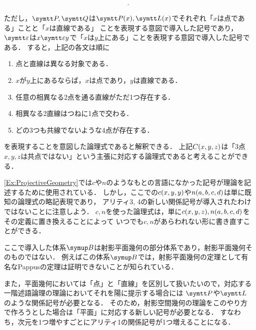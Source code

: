 \begin{Ex}
\begin{enumerate}
\begin{align*}
{			      }.
		      \end{align*}
	\end{enumerate}
	ただし，\(\obj{P}, \obj{Q}\)は\(\apply{\obj{P}}{x}, \apply{\obj{L}}{x}\)でそれぞれ「\(x\)は点である」ことと「\(x\)は直線である」
	ことを表現する意図で導入した記号であり，
	\(\LiesOn\)は\(x \LiesOn y\)で「\(x\)は\(y\)上にある」ことを表現する意図で導入した記号である．
	すると，上記の各文は順に
	\begin{enumerate}
		\item 点と直線は異なる対象である．
		\item \(x\)が\(y\)上にあるならば，\(x\)は点であり，\(y\)は直線である．
		\item 任意の相異なる2点を通る直線がただ1つ存在する．
		\item 相異なる2直線はつねに1点で交わる．
		\item どの3つも共線でないような4点が存在する．
	\end{enumerate}
	を表現することを意図した論理式であると解釈できる．
	上記\(\apply{C}{x, y, z}\)は「3点\(x, y, z\)は共点ではない」という主張に対応する論理式であると考えることができる．
\end{Ex}

\begin{Note}
	\cref{Ex:ProjectiveGeometry}では\(c\)や\(n\)のようなもとの言語になかった記号が理論を記述するために使用されている．
	しかし，ここでの\(\apply{c}{x, y, y}\)や\(\apply{n}{a, b, c, d}\)は単に既知の論理式の略記表現であり，
	アリティ3, 4の新しい関係記号が導入されたわけではないことに注意しよう．
	\(c, n\)を使った論理式は，単に\(\apply{c}{x, y, z}, \apply{n}{a, b, c, d}\)をその定義に置き換えることによって
	いつでも\(c, n\)があらわれない形に書き直すことができる．
\end{Note}

\begin{Note}
	ここで導入した体系\(\ProjectiveGeometryPart\)は射影平面幾何の部分体系であり，射影平面幾何そのものではない．
	例えばこの体系\(\ProjectiveGeometryPart\)では，射影平面幾何の定理として有名なPappusの定理は証明できないことが知られている．

	また，平面幾何においては「点」と「直線」を区別して扱いたいので，対応する一階述語論理の理論においてそれを陽に提示する場合には
	\(\obj{P}\)や\(\obj{L}\)のような関係記号が必要となる．
	そのため，射影空間幾何の理論をこのやり方で作ろうとした場合は「平面」に対応する新しい記号が必要となる．
	すなわち，次元を1つ増やすごとにアリティ1の関係記号が1つ増えることになる．
\end{Note}


